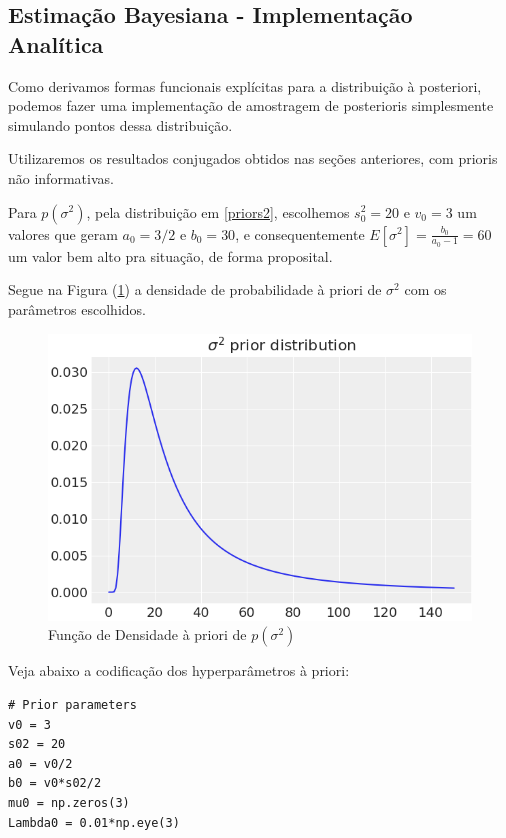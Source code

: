 \documentclass[12pt,letterpaper]{article}
\begin{document}
	\subsection{Estimação Bayesiana - Implementação Analítica}
	
	Como derivamos formas funcionais explícitas para a distribuição à posteriori, podemos fazer uma implementação de amostragem de posterioris simplesmente simulando pontos dessa distribuição.
	
	Utilizaremos os resultados conjugados obtidos nas seções anteriores, com prioris não informativas.
	
	Para $p(\sigma^2)$, pela distribuição em \ref{priors2}, escolhemos $s_0^2=20$ e $v_0=3$ um valores que geram $a_0=3/2$ e $b_0=30$, e consequentemente $E[\sigma^2]=\frac{b_0}{a_0-1}=60$ um valor bem alto pra situação, de forma proposital.
	
	Segue na Figura (\ref{sig2prior})
	a densidade de probabilidade à priori de $\sigma^2$ com os parâmetros escolhidos.
	
	\begin{figure}[!htb]
		\centering
		\includegraphics[scale=0.5]{../images/sigma2_prior.png}
		\caption{Função de Densidade à priori de $p(\sigma^2)$}
		\label{sig2prior}
	\end{figure}

	Veja abaixo a codificação dos hyperparâmetros à priori:
	
	\begin{lstlisting}[language=iPython]
# Prior parameters
v0 = 3
s02 = 20
a0 = v0/2
b0 = v0*s02/2
mu0 = np.zeros(3)
Lambda0 = 0.01*np.eye(3)
	\end{lstlisting}
	
\end{document}
